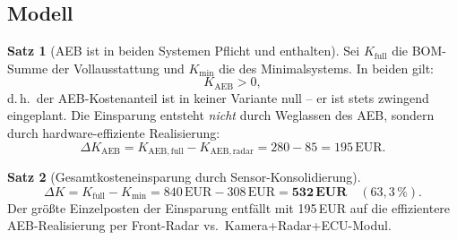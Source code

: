 \documentclass[a4paper,12pt]{article}
\theoremstyle{definition}
\newtheorem{satz}{Satz}
\begin{document}
\subsection{Modell}

\begin{satz}[AEB ist in beiden Systemen Pflicht und enthalten]
\label{satz:aeb_in_beiden}
Sei $K_\mathrm{full}$ die BOM-Summe der Vollausstattung und
$K_\mathrm{min}$ die des Minimalsystems. In beiden gilt:
\[
K_\mathrm{AEB} > 0,
\]
d.\,h.\ der AEB-Kostenanteil ist in keiner Variante null -- er ist
stets zwingend eingeplant. Die Einsparung entsteht \emph{nicht} durch
Weglassen des AEB, sondern durch hardware-effiziente Realisierung:
\[
\Delta K_\mathrm{AEB} = K_\mathrm{AEB,full} - K_\mathrm{AEB,radar}
= 280 - 85 = 195\,\text{EUR}.
\]
\end{satz}

\begin{satz}[Gesamtkosteneinsparung durch Sensor-Konsolidierung]
\label{satz:kosten}
\[
\Delta K = K_\mathrm{full} - K_\mathrm{min}
= 840\,\text{EUR} - 308\,\text{EUR} = \mathbf{532\,\text{EUR}}
\quad (63{,}3\,\%).
\]
Der gr\"o\ss{}te Einzelposten der Einsparung entf\"allt mit 195\,EUR auf
die effizientere AEB-Realisierung per Front-Radar vs.\ Kamera+Radar+ECU-Modul.
\end{satz}
\end{document}
